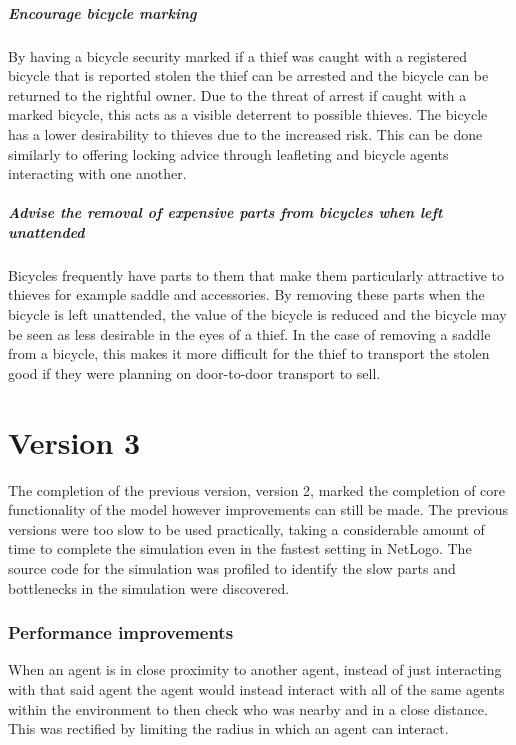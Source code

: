 \documentclass[11pt]{informatics-report}
\begin{document}
\subparagraph{Encourage bicycle marking}
\paragraph{}
By having a bicycle security marked if a thief was caught with a registered bicycle that is reported stolen the thief can be arrested and the bicycle can be returned to the rightful owner. Due to the threat of arrest if caught with a marked bicycle, this acts as a visible deterrent to possible thieves. The bicycle has a lower desirability to thieves due to the increased risk. This can be done similarly to offering locking advice through leafleting and bicycle agents interacting with one another.

\subparagraph{Advise the removal of expensive parts from bicycles when left unattended}
\paragraph{}
Bicycles frequently have parts to them that make them particularly attractive to thieves for example saddle and accessories. By removing these parts when the bicycle is left unattended, the value of the bicycle is reduced and the bicycle may be seen as less desirable in the eyes of a thief. In the case of removing a saddle from a bicycle, this makes it more difficult for the thief to transport the stolen good if they were planning on door-to-door transport to sell. 

\section{Version 3}
The completion of the previous version, version 2, marked the completion of core functionality of the model however improvements can still be made. The previous versions were too slow to be used practically, taking a considerable amount of time to complete the simulation even in the fastest setting in NetLogo. The source code for the simulation was profiled to identify the slow parts and bottlenecks in the simulation were discovered. 

\subsubsection{Performance improvements}
When an agent is in close proximity to another agent, instead of just interacting with that said agent the agent would instead interact with all of the same agents within the environment to then check who was nearby and in a close distance. This was rectified by limiting the radius in which an agent can interact. 
\end{document}
